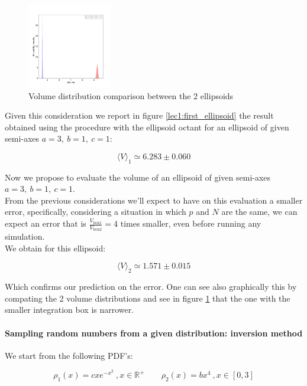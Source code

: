 \begin{figure}
    \vspace{-25pt}
    \centering
    \includegraphics[width=0.33\textwidth]{FIG/exercise_0_images/first_and_second_ellipsoid_distribution.png}
  \caption{Volume distribution comparison between the 2 ellipsoids}
  \label{lec1:first_and_second_ellipsoid}
  \end{figure}

Given this consideration we report in figure \ref{lec1:first_ellipsoid} the result obtained using the procedure with the ellipsoid octant for an ellipsoid of given semi-axes $a=3,\ b=1,\ c=1$:

$$\langle V \rangle_1 \simeq 6.283 \pm 0.060$$

Now we propose to evaluate the volume of an ellipsoid of given semi-axes $a=3,\ b=1,\ c=1$. \\
From the previous considerations we'll expect to have on this evaluation a smaller error, specifically, considering a situation in which $p$
and $N$ are the same, we can expect an error that is $\frac{V_{\text{box1}}}{V_{\text{box2}}} = 4$ times smaller, even before running any simulation. \\
We obtain for this ellipsoid:

$$\langle V \rangle_2 \simeq 1.571 \pm 0.015$$

Which confirms our prediction on the error. One can see also graphically this by compating the 2 volume distributions and see in figure \ref{lec1:first_and_second_ellipsoid} that the one with the
smaller integration box is narrower.




\paragraph{Sampling random numbers from a given distribution: inversion method}

We start from the following PDF's:

$$ \rho_1(x) = cxe^{-x^2}\ ,x \in \mathbb{R}^+ \qquad \rho_2(x) = bx^4\ , x \in [0,3]$$

